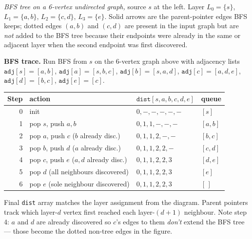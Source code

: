 \documentclass[11pt]{article}
\begin{document}
\begin{center}
\end{center}

\emph{BFS tree on a 6-vertex undirected graph,} source $s$ at the
left. Layer $L_0 = \{s\}$, $L_1 = \{a, b\}$, $L_2 = \{c, d\}$,
$L_3 = \{e\}$. Solid arrows are the parent-pointer edges BFS keeps;
dotted edges $(a, b)$ and $(c, d)$ are present in the input graph
but are \emph{not} added to the BFS tree because their endpoints
were already in the same or adjacent layer when the second endpoint
was first discovered.

\begin{examplebox}
\textbf{BFS trace.} Run BFS from $s$ on the 6-vertex graph above
with adjacency lists $\texttt{adj}[s] = [a, b]$,
$\texttt{adj}[a] = [s, b, c]$, $\texttt{adj}[b] = [s, a, d]$,
$\texttt{adj}[c] = [a, d, e]$, $\texttt{adj}[d] = [b, c]$,
$\texttt{adj}[e] = [c]$.

\medskip
\begin{tabular}{rp{6.5cm}|l|l}
\hline
Step & action & $\texttt{dist}[s,a,b,c,d,e]$ & queue \\
\hline
0 & init & $0,-,-,-,-,-$ & $[s]$ \\
1 & pop $s$, push $a, b$ & $0,1,1,-,-,-$ & $[a, b]$ \\
2 & pop $a$, push $c$ ($b$ already disc.) & $0,1,1,2,-,-$ & $[b, c]$ \\
3 & pop $b$, push $d$ ($a$ already disc.) & $0,1,1,2,2,-$ & $[c, d]$ \\
4 & pop $c$, push $e$ ($a, d$ already disc.) & $0,1,1,2,2,3$ & $[d, e]$ \\
5 & pop $d$ (all neighbours discovered) & $0,1,1,2,2,3$ & $[e]$ \\
6 & pop $e$ (sole neighbour discovered) & $0,1,1,2,2,3$ & $[\,]$ \\
\hline
\end{tabular}

\medskip
Final \texttt{dist} array matches the layer assignment from the
diagram. Parent pointers track which layer-$d$ vertex first reached
each layer-$(d{+}1)$ neighbour. Note step 4: $a$ and $d$ are already
discovered so $c$'s edges to them \emph{don't} extend the BFS tree
--- those become the dotted non-tree edges in the figure.
\end{examplebox}
\end{document}

